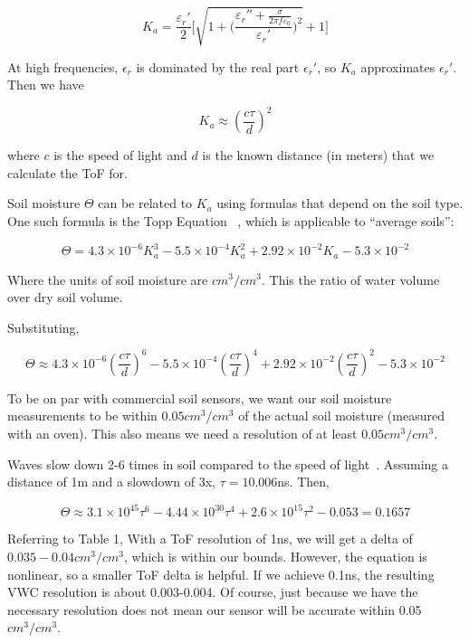\documentclass[12pt]{article}
\begin{document}
\begin{equation}
  K_a = \frac{\varepsilon_r'}{2}\Bigg[\sqrt{1+\bigg(\frac{\varepsilon_r'' + \frac{\sigma}{2\pi f\varepsilon_0}}{\varepsilon_r'}\bigg)^2}+1\Bigg]  
\end{equation}

At high frequencies, $\epsilon_r$ is dominated by the real part
$\epsilon_r'$, so $K_a$ approximates $\epsilon_r'$. Then we have

\begin{equation}
K_a \approx (\frac{c\tau}{d})^2
\end{equation}

where $c$ is the speed of light and $d$ is the known distance (in
meters) that we calculate the ToF for.

Soil moisture $\Theta$ can be related to $K_a$ using formulas that depend on the soil type. One such formula is the Topp Equation ~\cite{Topp1980}, which is applicable to ``average soils'':

\begin{equation}
  \Theta = 4.3\times 10^{-6}K_a^3-5.5\times10^{-4}K_a^2+2.92\times 10^{-2}K_a-5.3\times 10^{-2}
\end{equation}

Where the units of soil moisture are $cm^3/cm^3$. This the ratio of water volume over dry soil volume.

Substituting,

\begin{equation}
  \Theta \approx 4.3\times 10^{-6} (\frac{c\tau}{d})^6-5.5\times10^{-4} (\frac{c\tau}{d})^4+2.92\times 10^{-2} (\frac{c\tau}{d})^2-5.3\times 10^{-2}
\end{equation}

To be on par with commercial soil sensors, we want our soil moisture
measurements to be within $0.05 cm^3/cm^3$ of the actual soil moisture
(measured with an oven). This also means we need a resolution of at
least $0.05 cm^3/cm^3$.

Waves slow down 2-6 times in soil compared to the speed of
light~\cite{gpr}. Assuming a distance of 1m and a slowdown of 3x,
$\tau = 10.006$ns. Then,

\begin{equation}
  \Theta \approx 3.1\times 10^{45}\tau^6-4.44\times 10^{30}\tau^4+2.6\times 10^{15}\tau^2-0.053 = 0.1657
\end{equation}

Referring to Table 1, With a ToF resolution of 1ns, we will get a
delta of $0.035-0.04 cm^3/cm^3$, which is within our bounds. However,
the equation is nonlinear, so a smaller ToF delta is helpful. If we
achieve 0.1ns, the resulting VWC resolution is about 0.003-0.004. Of
course, just because we have the necessary resolution does not mean
our sensor will be accurate within 0.05$cm^3/cm^3$.
\end{document}
